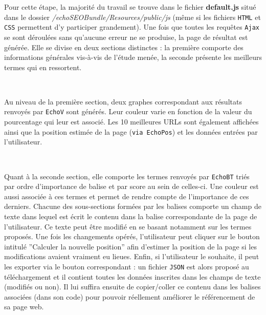 \documentclass[12pt]{article}
\begin{document}
\newpage
Pour cette étape, la majorité du travail se trouve dans le fichier \textbf{default.js} situé dans le dossier \textit{/echoSEOBundle/Resources/public/js} (même si les fichiers \texttt{HTML} et \texttt{CSS} permettent d'y participer grandement). Une fois que toutes les requêtes \texttt{Ajax} se sont déroulées sans qu'aucune erreur ne se produise, la page de résultat est générée. Elle se divise en deux sections distinctes : la première comporte des informations générales vis-à-vis de l'étude menée, la seconde présente les meilleurs termes qui en ressortent.

\

Au niveau de la première section, deux graphes correspondant aux résultats renvoyés par \texttt{EchoV} sont générés. Leur couleur varie en fonction de la valeur du pourcentage qui leur est associé. Les 10 meilleures URLs sont également affichées ainsi que la position estimée de la page (\texttt{via EchoPos}) et les données entrées par l'utilisateur.

\

Quant à la seconde section, elle comporte les termes renvoyés par \texttt{EchoBT} triés par ordre d'importance de balise et par score au sein de celles-ci. Une couleur est aussi associée à ces termes et permet de rendre compte de l'importance de ces derniers. Chacune des sous-sections formées par les balises comporte un champ de texte dans lequel est écrit le contenu dans la balise correspondante de la page de l'utilisateur. Ce texte peut être modifié en se basant notamment sur les termes proposés. Une fois les changements opérés, l'utilisateur peut cliquer sur le bouton intitulé ''Calculer la nouvelle position'' afin d'estimer la position de la page si les modifications avaient vraiment eu lieues. Enfin, si l'utilisateur le souhaite, il peut les exporter via le bouton correspondant : un fichier \texttt{JSON} est alors proposé au téléchargement et il contient toutes les données inscrites dans les champs de texte (modifiés ou non). Il lui suffira ensuite de copier/coller ce contenu dans les balises associées (dans son code) pour pouvoir réellement améliorer le référencement de sa page web.
\end{document}
